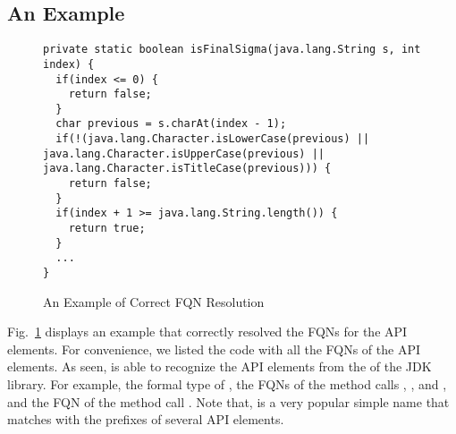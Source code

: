 \subsection*{An Example}

\begin{figure}[t]
	\centering
\begin{lstlisting}[]
private static boolean isFinalSigma(java.lang.String s, int index) {
  if(index <= 0) {
    return false;
  }
  char previous = s.charAt(index - 1);
  if(!(java.lang.Character.isLowerCase(previous) || java.lang.Character.isUpperCase(previous) || java.lang.Character.isTitleCase(previous))) {
    return false;
  }
  if(index + 1 >= java.lang.String.length()) {
    return true;
  }
  ...
}
\end{lstlisting}
        \vspace{-12pt}
        \caption{An Example of Correct FQN Resolution}
        \label{fig:ex1}
\end{figure}

Fig.~\ref{fig:ex1} displays an example that {\tool} correctly resolved
the FQNs for the API elements. For convenience, we listed the code
with all the FQNs of the API elements. As seen, {\tool} is able to
recognize the API elements from the  of the JDK
library. For example, the formal type  of , the
FQNs of the method calls , , and
, and the FQN of the method call .
Note that,  is a very popular simple name that matches
with the prefixes of several API elements.

